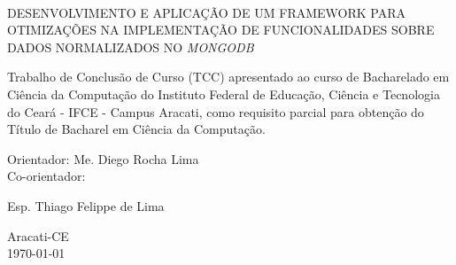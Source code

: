 \vfill
\begin{center}

{\imprimirautor\\}
\vspace{3cm}
{\textsc{\uppercase{Desenvolvimento e Aplicação de um Framework para Otimizações na Implementação de Funcionalidades Sobre Dados Normalizados no \textit{MongoDB}}}\\}
\vspace{5cm}
\hspace{.45\linewidth}
\begin{minipage}{.50\linewidth}
Trabalho de Conclusão de Curso (TCC) apresentado ao curso de Bacharelado em Ciência da Computação do Instituto Federal de Educação, Ciência e Tecnologia do Ceará - IFCE - Campus Aracati, como requisito parcial para obtenção do Título de Bacharel em Ciência da Computação.

\vspace{0.5 cm}

Orientador: Me. Diego Rocha Lima\\
Co-orientador: \raggedright{Esp. Thiago Felippe de Lima}

\end{minipage}

\vspace{2cm}
\vfill
{\large Aracati-CE\\\today}

\end{center}

